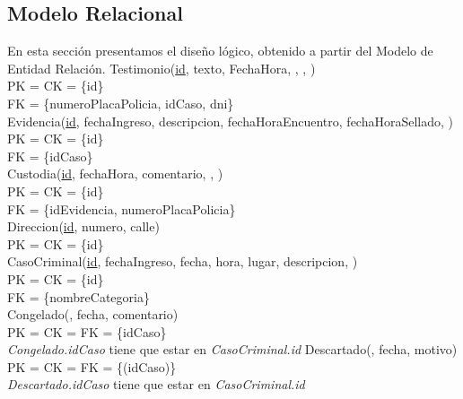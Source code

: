 \documentclass[10pt,a4paper]{article}
\begin{document}
\subsection{Modelo Relacional}
En esta sección presentamos el diseño lógico, obtenido a partir del Modelo de Entidad Relación. 
\newline
\newline
Testimonio(\underline{id}, texto, FechaHora, , , )\\
	PK = CK = \{id\}\\ 
	FK = \{numeroPlacaPolicia, idCaso, dni\}\\ 
\newline
Evidencia(\underline{id}, fechaIngreso, descripcion, fechaHoraEncuentro, fechaHoraSellado, )\\ 
	PK = CK = \{id\} \\
	FK = \{idCaso\}\\ 
\newline
Custodia(\underline{id}, fechaHora, comentario, , )\\ 
	PK = CK = \{id\} \\
	FK = \{idEvidencia, numeroPlacaPolicia\}\\ 
\newline
Direccion(\underline{id}, numero, calle)\\ 
	PK = CK = \{id\}\\ 
\newline
CasoCriminal(\underline{id}, fechaIngreso, fecha, hora, lugar, descripcion, )\\ 
	PK = CK = \{id\}\\ 
	FK = \{nombreCategoria\}\\ 
\newline
Congelado(, fecha, comentario)\\ 
	PK = CK = FK = \{idCaso\}\\ 
\newline
\textit{Congelado.idCaso} tiene que estar en \textit{CasoCriminal.id}
\newline
\newline
Descartado(, fecha, motivo)\\ 
	PK = CK = FK = \{(idCaso)\}\\ 
\newline
\textit{Descartado.idCaso} tiene que estar en \textit{CasoCriminal.id}
\newline
\end{document}
